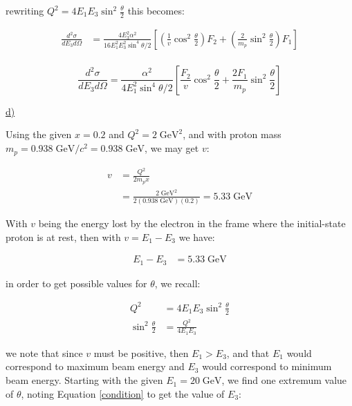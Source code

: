 \documentclass[11pt]{article}
\theoremstyle{definition}
\begin{document}
rewriting $Q^2 = 4E_1E_3\sin^2\frac{\theta}{2}$ this becomes:

\begin{align}
    \frac{d^2\sigma}{dE_3d\Omega}
    &=
    \frac{4E_3^2\alpha^2}{16E_1^2E_3^2\sin^4\theta/2}
    \left[
        \left(
            \frac{1}{v}
            \cos^2\frac{\theta}{2}
        \right)
        F_2
        +
        \left(
            \frac{2}{m_p}
        \sin^2\frac{\theta}{2}\right)
        F_1
    \right]\\
\end{align}

\begin{equation}
\boxed{
    \frac{d^2\sigma}{dE_3d\Omega}
    =
    \frac{\alpha^2}{4E_1^2\sin^4\theta/2}
    \left[
        \frac{F_2}{v}\cos^2\frac{\theta}{2}
        +
        \frac{2F_1}{m_p}
        \sin^2\frac{\theta}{2}
    \right]
}
\end{equation}

\newpage
\underline{d)}

Using the given $x=0.2$ and $Q^2=2\; \text{GeV}^2$, and with proton mass $m_p = 0.938\;\text{GeV}/c^2 = 0.938\;\text{GeV}$, we may get $v$:

\begin{align}
    v &= \frac{Q^2}{2m_px}\\
    &= \frac{2\; \text{GeV}^2}{2(0.938\;\text{GeV})(0.2)} = 5.33\;\text{GeV}
\end{align}

With $v$ being the energy lost by the electron in the frame where the initial-state proton is at rest, then with $v=E_1-E_3$ we have:

\begin{align}\label{condition}
    E_1-E_3 &= 5.33\;\text{GeV}
\end{align}

in order to get possible values for $\theta$, we recall:

\begin{align}
    Q^2 &= 4E_1E_3\sin^2\frac{\theta}{2}\\
    \sin^2\frac{\theta}{2} &= \frac{Q^2}{4E_1E_3}
\end{align}

we note that since $v$ must be positive, then $E_1>E_3$, and that $E_1$ would correspond to maximum beam energy and $E_3$ would correspond to minimum beam energy. Starting with the given $E_1 = 20\;\text{GeV}$, we find one extremum value of $\theta$, noting Equation \ref{condition} to get the value of $E_3$:
\end{document}

